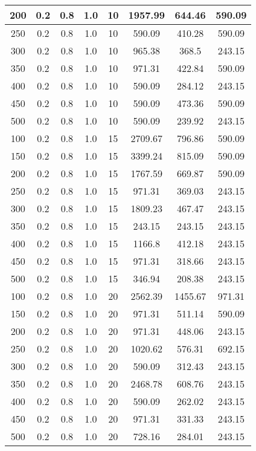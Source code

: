 \documentclass[a4paper, 12pt]{extreport}
\begin{document}
\begin{itemize}
\begin{longtable}{|c|c|c|c|c|c|c|c|}
			200 & 0.2 & 0.8 & 1.0 & 10 & 1957.99 & 644.46 & 590.09 \\\hline
			250 & 0.2 & 0.8 & 1.0 & 10 & 590.09 & 410.28 & 590.09 \\\hline
			300 & 0.2 & 0.8 & 1.0 & 10 & 965.38 & 368.5 & 243.15 \\\hline
			350 & 0.2 & 0.8 & 1.0 & 10 & 971.31 & 422.84 & 590.09 \\\hline
			400 & 0.2 & 0.8 & 1.0 & 10 & 590.09 & 284.12 & 243.15 \\\hline
			450 & 0.2 & 0.8 & 1.0 & 10 & 590.09 & 473.36 & 590.09 \\\hline
			500 & 0.2 & 0.8 & 1.0 & 10 & 590.09 & 239.92 & 243.15 \\\hline
			100 & 0.2 & 0.8 & 1.0 & 15 & 2709.67 & 796.86 & 590.09 \\\hline
			150 & 0.2 & 0.8 & 1.0 & 15 & 3399.24 & 815.09 & 590.09 \\\hline
			200 & 0.2 & 0.8 & 1.0 & 15 & 1767.59 & 669.87 & 590.09 \\\hline
			250 & 0.2 & 0.8 & 1.0 & 15 & 971.31 & 369.03 & 243.15 \\\hline
			300 & 0.2 & 0.8 & 1.0 & 15 & 1809.23 & 467.47 & 243.15 \\\hline
			350 & 0.2 & 0.8 & 1.0 & 15 & 243.15 & 243.15 & 243.15 \\\hline
			400 & 0.2 & 0.8 & 1.0 & 15 & 1166.8 & 412.18 & 243.15 \\\hline
			450 & 0.2 & 0.8 & 1.0 & 15 & 971.31 & 318.66 & 243.15 \\\hline
			500 & 0.2 & 0.8 & 1.0 & 15 & 346.94 & 208.38 & 243.15 \\\hline
			100 & 0.2 & 0.8 & 1.0 & 20 & 2562.39 & 1455.67 & 971.31 \\\hline
			150 & 0.2 & 0.8 & 1.0 & 20 & 971.31 & 511.14 & 590.09 \\\hline
			200 & 0.2 & 0.8 & 1.0 & 20 & 971.31 & 448.06 & 243.15 \\\hline
			250 & 0.2 & 0.8 & 1.0 & 20 & 1020.62 & 576.31 & 692.15 \\\hline
			300 & 0.2 & 0.8 & 1.0 & 20 & 590.09 & 312.43 & 243.15 \\\hline
			350 & 0.2 & 0.8 & 1.0 & 20 & 2468.78 & 608.76 & 243.15 \\\hline
			400 & 0.2 & 0.8 & 1.0 & 20 & 590.09 & 262.02 & 243.15 \\\hline
			450 & 0.2 & 0.8 & 1.0 & 20 & 971.31 & 331.33 & 243.15 \\\hline
			500 & 0.2 & 0.8 & 1.0 & 20 & 728.16 & 284.01 & 243.15 \\\hline

\end{longtable}
\end{itemize}
\end{document}
